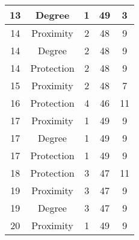 \documentclass[results.tex]{subfiles}
\begin{document}
\begin{center}
\begin{tabular}{| c || c | c | c | c |}
            \hline
            13                      & Degree                       & 1                      & 49                      & 3                    \\
            \hline
            14                      & Proximity                    & 2                      & 48                      & 9                    \\
            \hline
            14                      & Degree                       & 2                      & 48                      & 9                    \\
            \hline
            14                      & Protection                   & 2                      & 48                      & 9                    \\
            \hline
            15                      & Proximity                    & 2                      & 48                      & 7                    \\
            \hline
            16                      & Protection                   & 4                      & 46                      & 11                   \\
            \hline
            17                      & Proximity                    & 1                      & 49                      & 9                    \\
            \hline
            17                      & Degree                       & 1                      & 49                      & 9                    \\
            \hline
            17                      & Protection                   & 1                      & 49                      & 9                    \\
            \hline
            18                      & Protection                   & 3                      & 47                      & 11                   \\
            \hline
            19                      & Proximity                    & 3                      & 47                      & 9                    \\
            \hline
            19                      & Degree                       & 3                      & 47                      & 9                    \\
            \hline
            20                      & Proximity                    & 1                      & 49                      & 9                    \\

\end{tabular}
\end{center}
\end{document}
